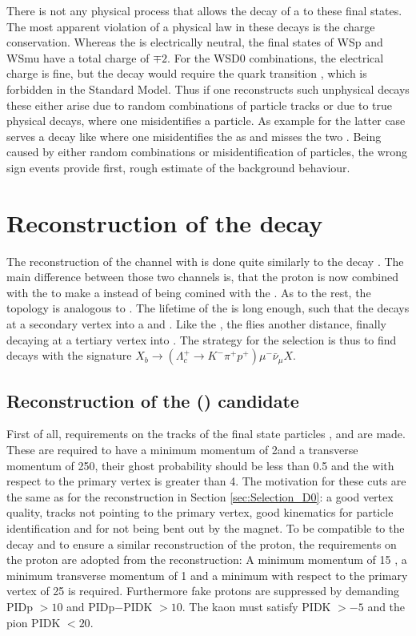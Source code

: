There is not any physical process that allows the decay of a \Lb to these final states.
The most apparent violation of a physical law in these decays is the charge conservation.
Whereas the \Lb is electrically neutral, the final states of WSp and WSmu have a total charge of $\mp 2$.
For the WSD0 combinations, the electrical charge is fine, but the decay \decay{\Lb}{\Dzb\proton\mun} would require the quark transition \bquark \to \cquarkbar, which is forbidden in the Standard Model.
Thus if one reconstructs such unphysical decays these either arise due to random combinations of particle tracks or due to true physical decays, where one misidentifies a particle.
As example for the latter case serves a decay like \decay{\Bz}{\Dz\mun\pip\pip\piz} where one misidentifies the \piz as \antiproton and misses the two \pip.
Being caused by either random combinations or misidentification of particles, the wrong sign events provide first, rough estimate of the \LbToDpmunuX background behaviour.

\section{Reconstruction of the decay \LbToLcmunu}
The reconstruction of the \LbToLcmunu channel with \LcTopKpi is done quite similarly to the decay \LbToDpmunuX.
The main difference between those two channels is, that the proton is now combined with the \Km\pip to make a \LcTopKpi instead of being comined with the \Dz\mun.
As to the rest, the topology is analogous to \LbToDpmunuX.
The lifetime of the \Lb is long enough, such that the \Lb decays at a secondary vertex into a \Lc and \mun.
Like the \Dz, the \Lc flies another distance, finally decaying at a tertiary vertex into \pKpi.
The strategy for the selection is thus to find decays with the signature $X_{b} \rightarrow (\Lambda_c^+ \rightarrow K^- \pi^+ p^+) \mu^- \bar{\nu}_{\mu} X$.

\subsection{Reconstruction of the \Lc (\pKpi) candidate}
First of all, requirements on the tracks of the final state particles \proton, \kaon and \pion are made.
These are required to have a minimum momentum of 2\gev and a transverse momentum of 250\mev, their ghost probability should be less than 0.5 and the \chisqip with respect to the primary vertex is greater than 4.
The motivation for these cuts are the same as for the \Dz reconstruction in Section \ref{sec:Selection_D0}:
a good vertex quality, tracks not pointing to the primary vertex, good kinematics for particle identification and for not being bent out by the magnet.
To be compatible to the \LbToDpmunuX decay and to ensure a similar reconstruction of the proton, the requirements on the proton are adopted from the \LbToDpmunuX reconstruction:
A minimum momentum of 15 \gev, a minimum transverse momentum of 1 \gev and a minimum \chisqip with respect to the primary vertex of 25 is required.
Furthermore fake protons are suppressed by demanding PIDp $> 10$ and PIDp$-$PIDK $> 10$.
The kaon must satisfy PIDK $>-5$ and the pion PIDK $< 20$.


